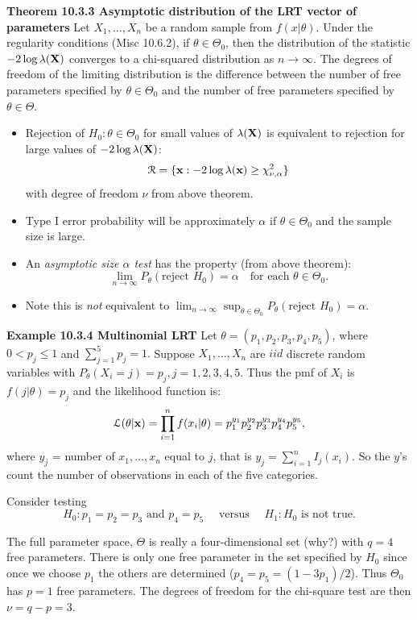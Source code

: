 \documentclass[11pt,]{article}
\newcommand{\Xndots}{X_1, \ldots, X_n}
\def\bx{{\bf x}}
\def\bX{{\bf X}}
\def\Lsc{{\cal L}}
\def\Rsc{{\cal R}}
\def\sumin{\sum_{i=1}^n}
\begin{document}
\noindent\textbf{Theorem 10.3.3 Asymptotic distribution of the LRT vector of parameters}
Let \(\Xndots\) be a random sample from \(f(x|\theta)\). Under the
regularity conditions (Misc 10.6.2), if \(\theta \in \Theta_0\), then
the distribution of the statistic \(-2 \log \lambda(\bX)\) converges to
a chi-squared distribution as \(n\to\infty\). The degrees of freedom of
the limiting distribution is the difference between the number of free
parameters specified by \(\theta \in \Theta_0\) and the number of free
parameters specified by \(\theta \in \Theta\).

\begin{itemize}
\item Rejection of $H_0 : \theta \in \Theta_0$ for small values of $\lambda(\bX)$ is equivalent to rejection for large values of $-2 \log \lambda(\bX)$:
$$\Rsc = \{ \bx: -2 \log \lambda(\bx) \geq \chi^2_{\nu, \alpha}\}$$
with degree of freedom $\nu$ from above theorem.
\item Type I error probability will be approximately $\alpha$ if $\theta \in \Theta_0$ and the sample size is large.
\item An {\em asymptotic size $\alpha$ test} has the property (from above theorem):
$$\lim_{n\to\infty} P_\theta(\mbox{reject } H_0) = \alpha \quad \mbox{for each } \theta \in \Theta_0.$$
\item Note this is {\em not} equivalent to
$\lim_{n\to\infty} \sup_{\theta \in  \Theta_0} P_\theta(\mbox{reject }H_0) = \alpha$.
\end{itemize}

\noindent\textbf{Example 10.3.4 Multinomial LRT} Let
\(\theta = (p_1, p_2, p_3, p_4, p_5)\), where \(0 < p_j \leq 1\) and
\(\sum_{j=1}^5 p_j = 1.\) Suppose \(\Xndots\) are \(iid\) discrete
random variables with \(P_\theta(X_i = j) = p_j, j=1,2,3,4,5\). Thus the
pmf of \(X_i\) is \(f(j|\theta) = p_j\) and the likelihood function is:
\[\Lsc(\theta |\bx) = \prod_{i=1}^n f(x_i|\theta)= p_1^{y_1}p_2^{y_2}p_3^{y_3}p_4^{y_4}p_5^{y_5},\]
where \(y_j\) = number of \(x_1, \ldots, x_n\) equal to \(j\), that is
\(y_j = \sumin I_{j}(x_i)\). So the \(y\)'s count the number of
observations in each of the five categories.

Consider testing
\[H_0: p_1 = p_2 = p_3 \mbox{ and } p_4 = p_5 \quad \mbox{ versus  } \quad H_1: H_0 \mbox{ is not true}.\]

The full parameter space, \(\Theta\) is really a four-dimensional set
(why?) with \(q=4\) free parameters. There is only one free parameter in
the set specified by \(H_0\) since once we choose \(p_1\) the others are
determined (\(p_4 = p_5 = (1-3p_1)/2\)). Thus \(\Theta_0\) has \(p=1\)
free parameters. The degrees of freedom for the chi-square test are then
\(\nu = q-p = 3\).
\end{document}
